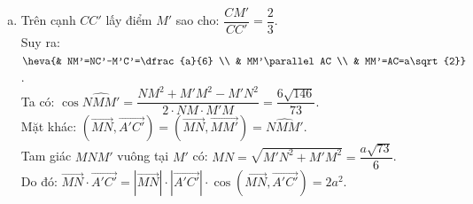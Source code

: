 \begin{ex}
{\begin{enumerate}[a)]
			      Do đó: $\vec{AN}\cdot \vec{AC}=\left| \vec{AN} \right| \cdot \left| \vec{AC} \right| \cdot \cos \left(\vec{AN},\vec{AC}\right)=\dfrac{3a}{2} \cdot a\sqrt{2} \cdot \dfrac{2\sqrt{2}}{3}=2a^2$.
			\item Trên cạnh $CC'$ lấy điểm $M'$ sao cho: $\dfrac{CM'}{CC'}=\dfrac{2}{3}$.\\
			      Suy ra: $\heva{& NM'=NC'-M'C'=\dfrac{a}{6} \\ & MM'\parallel AC \\ & MM'=AC=a\sqrt{2}} $.\\
			      Ta có: $\cos \widehat{NMM'}=\dfrac{NM^2+M'M^2-M'N^2}{2 \cdot NM \cdot M'M}=\dfrac{6\sqrt{146}}{73}$.\\
			      Mặt khác: $\left(\vec{MN},\vec{A'C'}\right)=\left(\vec{MN},\vec{MM'}\right)=\widehat{NMM'}$.\\
			      Tam giác $MNM'$ vuông tại $M'$ có: $MN=\sqrt{M'N^2+M'M^2}=\dfrac{a\sqrt{73}}{6}$.\\
			      Do đó: $\vec{MN}\cdot \vec{A'C'}=\left| \vec{MN} \right| \cdot \left| \vec{A'C'} \right| \cdot \cos \left(\vec{MN},\vec{A'C'}\right)=2a^2$.
		\end{enumerate}
	}
\end{ex}
